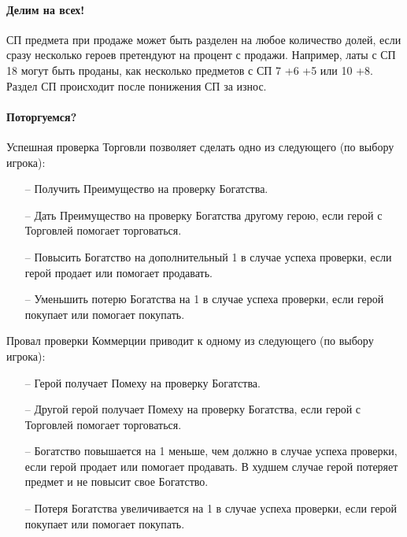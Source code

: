 \paragraph{Делим на всех!} СП предмета при продаже может быть разделен на любое количество долей, если сразу несколько героев претендуют на процент с продажи. Например, латы с СП 18 могут быть проданы, как несколько предметов с СП 7 +6 +5 или 10 +8. Раздел СП происходит после понижения СП за износ.

\paragraph{Поторгуемся?} Успешная проверка Торговли позволяет сделать одно из следующего (по выбору игрока):
\begin{itemize}
\item[--] Получить Преимущество на проверку Богатства.
\item[--] Дать Преимущество на проверку Богатства другому герою, если герой с Торговлей помогает торговаться.
\item[--] Повысить Богатство на дополнительный 1 в случае успеха проверки, если герой продает или помогает продавать.
\item[--] Уменьшить потерю Богатства на 1 в случае успеха проверки, если герой покупает или помогает покупать.
\end{itemize}
Провал проверки Коммерции приводит к одному из следующего (по выбору игрока):
\begin{itemize}
\item[--] Герой получает Помеху на проверку Богатства.
\item[--] Другой герой получает Помеху на проверку Богатства, если герой с Торговлей помогает торговаться.
\item[--] Богатство повышается на 1 меньше, чем должно в случае успеха проверки, если герой продает или помогает продавать. В худшем случае герой потеряет предмет и не повысит свое Богатство.
\item[--] Потеря Богатства увеличивается на 1 в случае успеха проверки, если герой покупает или помогает покупать.
\end{itemize}
